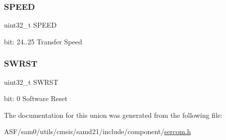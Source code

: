 \subsubsection{\texorpdfstring{SPEED}{SPEED}}
{\footnotesize\ttfamily uint32\+\_\+t S\+P\+E\+ED}

bit\+: 24..25 Transfer Speed \mbox{\label{union_s_e_r_c_o_m___i2_c_m___c_t_r_l_a___type_a34cd956a8da179cbd5fc9060306d420e}} 
\subsubsection{\texorpdfstring{SWRST}{SWRST}}
{\footnotesize\ttfamily uint32\+\_\+t S\+W\+R\+ST}

bit\+: 0 Software Reset 

The documentation for this union was generated from the following file\+:\begin{DoxyCompactItemize}
\item 
A\+S\+F/sam0/utils/cmsis/samd21/include/component/\mbox{\hyperlink{utils_2cmsis_2samd21_2include_2component_2sercom_8h}{sercom.\+h}}\end{DoxyCompactItemize}
